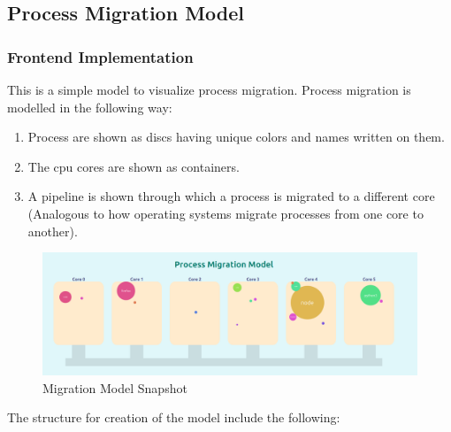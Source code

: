 \documentclass[12pt]{article}
\begin{document}
\subsection{Process Migration Model}
\subsubsection{Frontend Implementation}

This is a simple model to visualize process migration. Process migration is modelled in the following way:
\begin{enumerate}
    \item Process are shown as discs having unique colors and names written on them.
    \item The cpu cores are shown as containers.
    \item A pipeline is shown through which a process is migrated to a different core (Analogous to how operating systems migrate processes from one core to another).
\end{enumerate}
\begin{figure}[H]
    \centering
    \begin{minipage}{0.8\textwidth}
        \centering
        \includegraphics[width=\textwidth]{logos and images/Plot3.png}
    \end{minipage}
    \hfill
    
    \caption{Migration Model Snapshot}
\end{figure}
The structure for creation of the model include the following:
\end{document}
